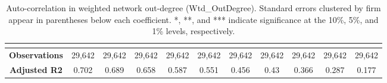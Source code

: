 \begin{table}
{\begin{tabular}{lcccccccccc}
  \multicolumn{1}{l}{} &
  \multicolumn{1}{l}{} \\ \hline
\multicolumn{1}{|c|}{\textbf{Observations}} &
  \multicolumn{1}{c|}{29,642} &
  \multicolumn{1}{c|}{29,642} &
  \multicolumn{1}{c|}{29,642} &
  \multicolumn{1}{c|}{29,642} &
  \multicolumn{1}{c|}{29,642} &
  \multicolumn{1}{c|}{29,642} &
  \multicolumn{1}{c|}{29,642} &
  \multicolumn{1}{c|}{29,642} &
  \multicolumn{1}{c|}{29,642} &
  \multicolumn{1}{c|}{29,642} \\ \hline
\multicolumn{1}{|c|}{\textbf{Adjusted R2}} &
  \multicolumn{1}{c|}{0.702} &
  \multicolumn{1}{c|}{0.689} &
  \multicolumn{1}{c|}{0.658} &
  \multicolumn{1}{c|}{0.587} &
  \multicolumn{1}{c|}{0.551} &
  \multicolumn{1}{c|}{0.456} &
  \multicolumn{1}{c|}{0.43} &
  \multicolumn{1}{c|}{0.366} &
  \multicolumn{1}{c|}{0.287} &
  \multicolumn{1}{c|}{0.177} \\ \hline
\end{tabular}}
\caption{Auto-correlation in weighted network out-degree (Wtd\_OutDegree).  Standard errors clustered by firm appear in parentheses below each coefficient. *, **, and *** indicate significance at the 10\%, 5\%, and 1\% levels, respectively. }
\label{tab:TEAutoCorrOut}
\end{table}


